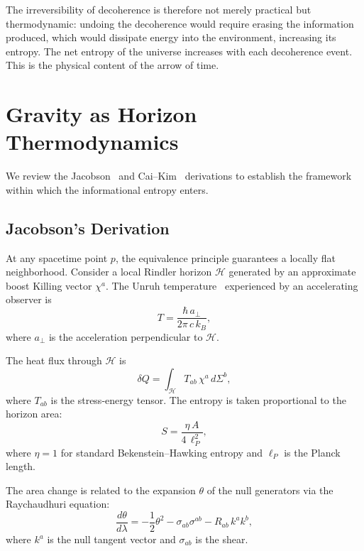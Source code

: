 \documentclass[11pt]{article}
\begin{document}
The irreversibility of decoherence is therefore not merely practical but
thermodynamic: undoing the decoherence would require erasing the information
produced, which would dissipate energy into the environment, increasing its
entropy.  The net entropy of the universe increases with each decoherence
event.  This is the physical content of the arrow of time.


\section{Gravity as Horizon Thermodynamics}
\label{sec:jacobson}

We review the Jacobson~\citep{Jacobson1995} and
Cai--Kim~\citep{CaiKim2005} derivations to establish the framework
within which the informational entropy enters.

\subsection{Jacobson's Derivation}

At any spacetime point $p$, the equivalence principle guarantees a locally
flat neighborhood.  Consider a local Rindler horizon $\mathcal{H}$ generated
by an approximate boost Killing vector $\chi^a$.  The Unruh
temperature~\citep{Unruh1976} experienced by an accelerating observer is
\begin{equation}
T = \frac{\hbar\,a_\perp}{2\pi\,c\,k_B},
\label{eq:unruh}
\end{equation}
where $a_\perp$ is the acceleration perpendicular to $\mathcal{H}$.

The heat flux through $\mathcal{H}$ is
\begin{equation}
\delta Q = \int_\mathcal{H} T_{ab}\,\chi^a\,d\Sigma^b,
\label{eq:heat_flux}
\end{equation}
where $T_{ab}$ is the stress-energy tensor.  The entropy is taken proportional
to the horizon area:
\begin{equation}
S = \frac{\eta\,A}{4\,\ell_P^2},
\label{eq:bh_entropy}
\end{equation}
where $\eta = 1$ for standard Bekenstein--Hawking entropy and $\ell_P$ is the
Planck length.

The area change is related to the expansion $\theta$ of the null generators
via the Raychaudhuri equation:
\begin{equation}
\frac{d\theta}{d\lambda} = -\frac{1}{2}\theta^2
  - \sigma_{ab}\sigma^{ab} - R_{ab}\,k^a k^b,
\label{eq:raychaudhuri}
\end{equation}
where $k^a$ is the null tangent vector and $\sigma_{ab}$ is the shear.
\end{document}

